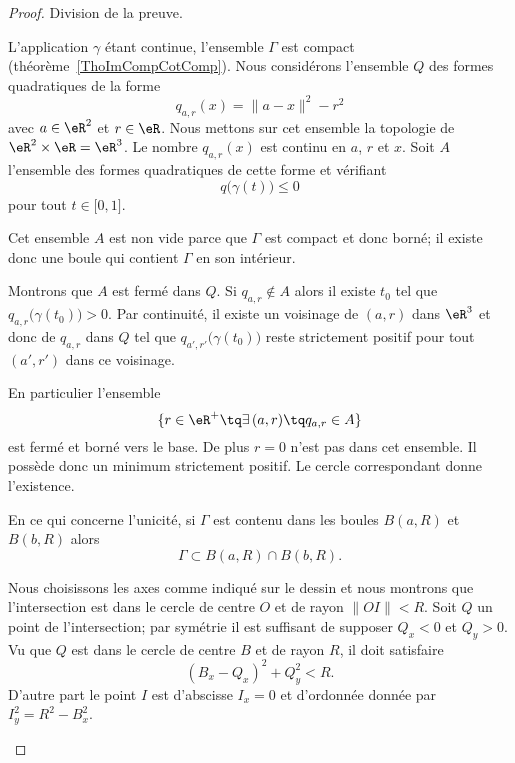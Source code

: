 \begin{proof}
	Division de la preuve.
	\begin{subproof}
		\spitem[Existence]
		L'application \( \gamma\) étant continue, l'ensemble \( \Gamma\) est compact (théorème~\ref{ThoImCompCotComp}). Nous considérons l'ensemble \( Q\) des formes quadratiques de la forme
		\begin{equation}
			q_{a,r}(x)=\| a-x \|^2-r^2
		\end{equation}
		avec \( a\in \eR^2\) et \( r\in \eR\). Nous mettons sur cet ensemble la topologie de \( \eR^2\times \eR=\eR^3\). Le nombre \( q_{a,r}(x)\) est continu en \( a\), \( r\) et \( x\). Soit \( A\) l'ensemble des formes quadratiques de cette forme et vérifiant
		\begin{equation}
			q\big( \gamma(t) \big)\leq 0
		\end{equation}
		pour tout \( t\in\mathopen[ 0 , 1 \mathclose]\).

		Cet ensemble \( A\) est non vide parce que \( \Gamma \) est compact et donc borné; il existe donc une boule qui contient \( \Gamma\) en son intérieur.

		Montrons que \( A\) est fermé dans \( Q\). Si \( q_{a,r}\notin A\) alors il existe \( t_0\) tel que \( q_{a,r}\big( \gamma(t_0) \big)>0\). Par continuité, il existe un voisinage de \( (a,r)\) dans \( \eR^3\)  et donc de \( q_{a,r}\) dans \( Q\) tel que \( q_{a',r'}\big( \gamma(t_0) \big)\) reste strictement positif pour tout \( (a',r')\) dans ce voisinage.

		En particulier l'ensemble
		\begin{equation}
			\{ r\in \eR^+\tq \exists\,(a,r)\tq q_{a,r}\in A \}
		\end{equation}
		est fermé et borné vers le base. De plus \( r=0\) n'est pas dans cet ensemble. Il possède donc un minimum strictement positif. Le cercle correspondant donne l'existence.
		\spitem[Unicité]

		En ce qui concerne l'unicité, si \( \Gamma\) est contenu dans les boules \( B(a,R)\) et \( B(b,R)\) alors
		\begin{equation}
			\Gamma\subset B(a,R)\cap B(b,R).
		\end{equation}

		\begin{center}
			
		\end{center}

		Nous choisissons les axes comme indiqué sur le dessin et nous montrons que l'intersection est dans le cercle de centre \( O\) et de rayon \( \| OI \|<R\). Soit \( Q\) un point de l'intersection; par symétrie il est suffisant de supposer \( Q_x<0\) et \( Q_y>0\). Vu que \( Q\) est dans le cercle de centre \( B\) et de rayon \( R\), il doit satisfaire
		\begin{equation}
			(B_x-Q_x)^2+Q_{y}^2<R.
		\end{equation}
		D'autre part le point \( I\) est d'abscisse \( I_x=0\) et d'ordonnée donnée par \( I_y^2=R^2-B_x^2\).


\end{subproof}
\end{proof}
